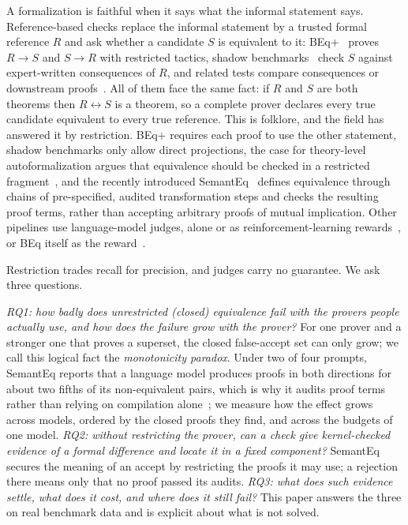\documentclass[10pt]{article}
\theoremstyle{definition}
\begin{document}
A formalization is faithful when it says what the informal statement says. Reference-based
checks replace the informal statement by a trusted formal reference $R$ and ask whether a
candidate $S$ is equivalent to it: BEq+~\cite{beq} proves $R\to S$ and $S\to R$ with restricted
tactics, shadow benchmarks~\cite{shadowbench} check $S$ against expert-written consequences of
$R$, and related tests compare consequences or downstream proofs~\cite{bpf,t2}. All of them face
the same fact: if $R$ and $S$ are both theorems then $R\leftrightarrow S$ is a theorem, so a
complete prover declares every true candidate equivalent to every true reference. This is
folklore, and the field has answered it by restriction. BEq+ requires each proof to use the other
statement, shadow benchmarks only allow direct projections, the case for theory-level
autoformalization argues that equivalence should be checked in a restricted fragment~\cite{tla},
and the recently introduced SemantEq~\cite{semanteq} defines equivalence through chains of
pre-specified, audited transformation steps and checks the resulting proof terms, rather than
accepting arbitrary proofs of mutual implication. Other pipelines use language-model judges, alone or as reinforcement-learning
rewards~\cite{beyondcomp,formarl,reform,criticlean}, or BEq itself as the reward~\cite{stepfun}.

Restriction trades recall for precision, and judges carry no guarantee. We ask three questions.

\emph{RQ1: how badly does unrestricted (closed) equivalence fail with the provers people actually
use, and how does the failure grow with the prover?} For one prover and a stronger one that
proves a superset, the closed false-accept set can only grow; we call this logical fact the
\emph{monotonicity paradox}. Under two of four prompts, SemantEq reports that a language model
produces proofs in both directions for about two fifths of its non-equivalent pairs, which is why
it audits proof terms rather than relying on compilation alone~\cite{semanteq}; we measure how
the effect grows across models, ordered by the closed proofs they find, and across the budgets of
one model. \emph{RQ2: without restricting the prover, can a check give kernel-checked evidence of
a formal difference and locate it in a fixed component?} SemantEq secures the meaning of an
accept by restricting the proofs it may use; a rejection there means only that no proof passed
its audits. \emph{RQ3: what does such evidence settle, what does it cost, and where does it still
fail?} This paper answers the three on real benchmark data and is explicit about what is not
solved.
\end{document}
